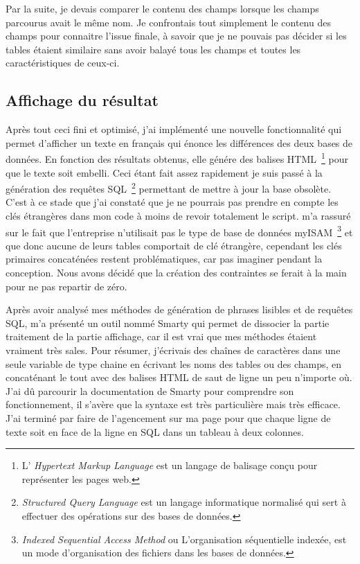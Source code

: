 Par la suite, je devais comparer le contenu des champs lorsque les
champs parcourus avait le même nom. Je confrontais tout simplement le
contenu des champs pour connaitre l'issue finale, à savoir que je ne
pouvais pas décider si les tables étaient similaire sans avoir balayé
tous les champs et toutes les caractéristiques de ceux-ci.

\subsection{Affichage du résultat} %
\label{sub:Affichage du résultat}

Après tout ceci fini et optimisé, j'ai implémenté une nouvelle
fonctionnalité qui permet d'afficher un texte en français qui énonce les
différences des deux bases de données. En fonction des résultats
obtenus, elle génére des balises HTML\, \footnote{L’ \emph{Hypertext
Markup Language} est un langage de balisage conçu pour représenter les
pages web.} pour que le texte soit embelli. Ceci étant fait assez
rapidement je suis passé à la génération des requêtes SQL\,
\footnote{\emph{Structured Query Language} est un langage informatique
normalisé qui sert à effectuer des opérations sur des bases de données.}
permettant de mettre à jour la base obsolète. C'est à ce stade que j'ai
constaté que je ne pourrais pas prendre en compte les clés étrangères
dans mon code à moins de revoir totalement le script.  
m'a rassuré sur le fait que l'entreprise n'utilisait pas le type de base
de données myISAM\, \footnote{\emph{Indexed Sequential Access Method} ou
L'organisation séquentielle indexée, est un mode d'organisation des
fichiers dans les bases de données.} et que donc aucune de leurs tables
comportait de clé étrangère, cependant les clés primaires concaténées
restent problématiques, car pas imaginer pendant la conception. Nous
avons décidé que la création des contraintes se ferait à la main pour ne
pas repartir de zéro.

Après avoir analysé mes méthodes de génération de phrases lisibles et de
requêtes SQL,  m'a présenté un outil nommé \og Smarty
\fg{} qui permet de dissocier la partie traitement de la partie
affichage, car il est vrai que mes méthodes étaient vraiment très sales.
Pour résumer, j'écrivais des chaînes de caractères dans une seule
variable de type chaine en écrivant les noms des tables ou des champs,
en concaténant le tout avec des balises HTML de saut de ligne un peu
n'importe où. J'ai dû parcourir la documentation de Smarty pour
comprendre son fonctionnement, il s'avère que la syntaxe est très
particulière mais très efficace. J'ai terminé par faire de l'agencement
sur ma page pour que chaque ligne de texte soit en face de la ligne
en SQL dans un tableau à deux colonnes.\\

